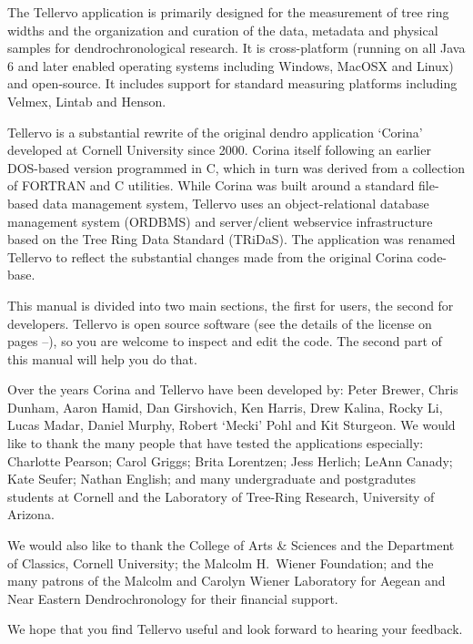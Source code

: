The Tellervo application is primarily designed for the measurement of tree ring widths and the organization and curation of the data, metadata and physical samples for dendrochronological research. It is cross-platform (running on all Java 6 and later enabled operating systems including Windows, MacOSX and Linux) and open-source. It includes support for standard measuring platforms including Velmex, Lintab and Henson.

Tellervo is a substantial rewrite of the original dendro application `Corina' developed at Cornell University since 2000.  Corina itself following an earlier DOS-based version programmed in C, which in turn was derived from a collection of FORTRAN and C utilities.  While Corina was built around a standard file-based data management system, Tellervo uses an object-relational database management system (ORDBMS) and server/client webservice infrastructure based on the Tree Ring Data Standard (TRiDaS).  The application was renamed Tellervo to reflect the substantial changes made from the original Corina code-base. 

This manual is divided into two main sections, the first for users, the second for developers.  Tellervo is open source software (see the details of the license on pages \pageref{txt:licenseStart}--\pageref{txt:licenseEnd}), so you are welcome to inspect and edit the code.  The second part of this manual will help you do that.

Over the years Corina and Tellervo have been developed by: Peter Brewer, Chris Dunham, Aaron Hamid, Dan Girshovich, Ken Harris, Drew Kalina, Rocky Li, Lucas Madar, Daniel Murphy, Robert `Mecki' Pohl and Kit Sturgeon.  We would like to thank the many people that have tested the applications especially: Charlotte Pearson; Carol Griggs; Brita Lorentzen; Jess Herlich; LeAnn Canady; Kate Seufer; Nathan English; and many undergraduate and postgradutes students at Cornell and the Laboratory of Tree-Ring Research, University of Arizona.  

We would also like to thank the College of Arts \& Sciences and the Department of Classics, Cornell University; the Malcolm H.\ Wiener Foundation; and the many patrons of the Malcolm and Carolyn Wiener Laboratory for Aegean and Near Eastern Dendrochronology for their financial support.  

We hope that you find Tellervo useful and look forward to hearing your feedback.  



